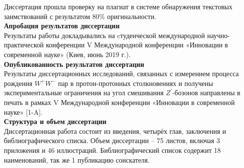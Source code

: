Диссертация прошла проверку на плагиат в системе обнаружения текстовых заимствований с результатом 80\% оригинальности.
\\

\textbf{Апробация результатов диссертации}\\

Результаты работы докладывались на cтуденческой международной научно-практической конференции V Международной конференции «Инновации в современной науке» (Киев, июнь 2019 г.).
\\

\vspace{5cm}
\textbf{Опубликованность результатов диссертации}\\

Результаты диссертационных исследований, связанных с измерением процесса рождения ${W}^{+}{W}^{-}$ пар в протон-протонных столкновениях и получены экспериментальные ограничения на угол смешивания ${Z}^{\prime}$-бозонов направлены в печать в рамках V Международной конференции «Инновации в современной науке» [1-A].
\\

\textbf{Структура и объем диссертации}\\

Диссертационная работа состоит из введения, четырёх глав, заключения и библиографического списка. Объем диссертации – 75 листов, включая 3 приложения и 46 иллюстраций. Библиографический список содержит 18 наименований, так же 1 публикацию соискателя.
